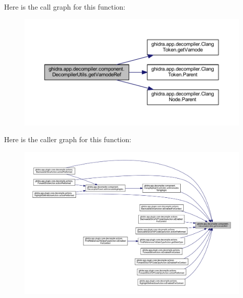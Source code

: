 Here is the call graph for this function\+:
\nopagebreak
\begin{figure}[H]
\begin{center}
\leavevmode
\includegraphics[width=350pt]{classghidra_1_1app_1_1decompiler_1_1component_1_1_decompiler_utils_a54a63bbb674ce85f95916cb263e7ada3_cgraph}
\end{center}
\end{figure}
Here is the caller graph for this function\+:
\nopagebreak
\begin{figure}[H]
\begin{center}
\leavevmode
\includegraphics[width=350pt]{classghidra_1_1app_1_1decompiler_1_1component_1_1_decompiler_utils_a54a63bbb674ce85f95916cb263e7ada3_icgraph}
\end{center}
\end{figure}
\mbox{\label{classghidra_1_1app_1_1decompiler_1_1component_1_1_decompiler_utils_ae4adb5edac8a860db65bc92ae0a4f9cd}} 
